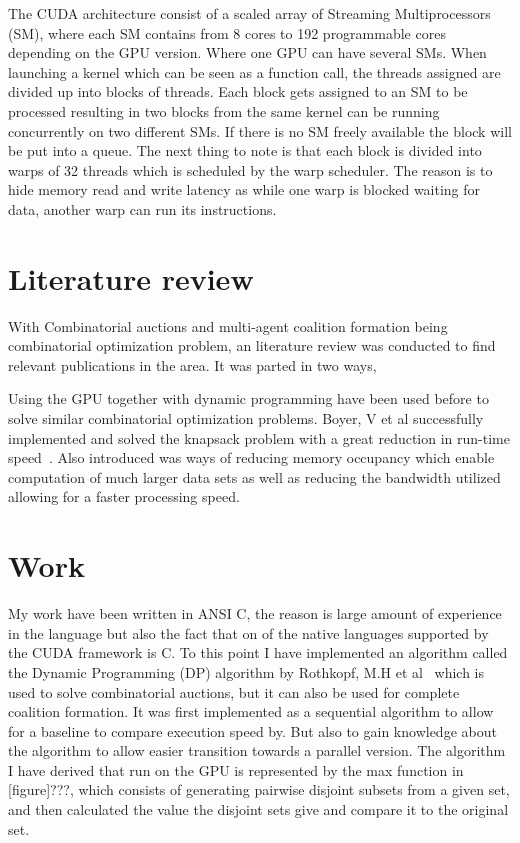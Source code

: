 \documentclass[a4paper, 12pt]{report}
\begin{document}
The CUDA architecture consist of a scaled array of Streaming Multiprocessors (SM), where each SM contains from 8 cores to 192 programmable cores depending on the GPU version. Where one GPU can have several SMs. When launching a kernel which can be seen as a function call, the threads assigned are divided up into blocks of threads. Each block gets assigned to an SM to be processed resulting in two blocks from the same kernel can be running concurrently on two different SMs. If there is no SM freely available the block will be put into a queue. The next thing to note is that each block is divided into warps of 32 threads which is scheduled by the warp scheduler. The reason is to hide memory read and write latency as while one warp is blocked waiting for data, another warp can run its instructions.


\section{Literature review}
With Combinatorial auctions and multi-agent coalition formation being combinatorial optimization problem, an literature review was conducted to find relevant publications in the area. It was parted in two ways, 

Using the GPU together with dynamic programming have been used before to solve similar combinatorial optimization problems. Boyer, V et al successfully implemented and solved the knapsack problem with a great reduction in run-time speed~\cite{boyer2012solving}. Also introduced was ways of reducing memory occupancy which enable computation of much larger data sets as well as reducing the bandwidth utilized allowing for a faster processing speed.



\section{Work}
My work have been written in ANSI C, the reason is large amount of experience in the language but also the fact that on of the native languages supported by the CUDA framework is C.
To this point I have implemented an algorithm called the Dynamic Programming (DP) algorithm by Rothkopf, M.H et al~\cite{rothkopf1998computationally} which is used to solve combinatorial auctions, but it can also be used for complete coalition formation. It was first implemented as a sequential algorithm to allow for a baseline to compare execution speed by. But also to gain knowledge about the algorithm to allow easier transition towards a parallel version. The algorithm I have derived that run on the GPU is represented by the max function in [figure]???, which consists of generating pairwise disjoint subsets from a given set, and then calculated the value the disjoint sets give and compare it to the original set. 
\end{document}
